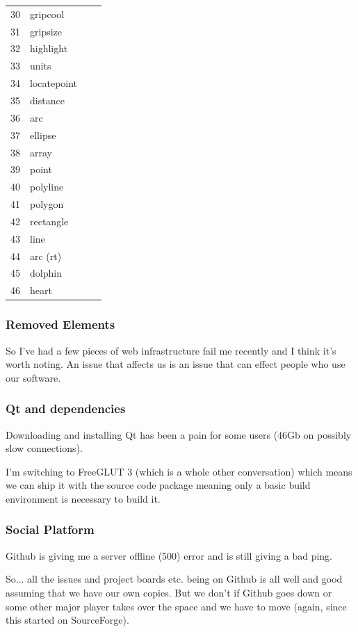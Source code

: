 \documentclass[a4paper, 11pt]{report}
\begin{document}
\begin{tabular}{l l l l}
30 & gripcool &  & \\
31 & gripsize &  & \\
32 & highlight &  & \\
33 & units &  & \\
34 & locatepoint &  & \\
35 & distance &  & \\
36 & arc &  & \\
37 & ellipse &  & \\
38 & array &  & \\
39 & point &  & \\
40 & polyline &  & \\
41 & polygon &  & \\
42 & rectangle &  & \\
43 & line &  & \\
44 & arc (rt) &  & \\
45 & dolphin &  & \\
46 & heart &  &
\end{tabular}

\subsubsection{Removed Elements}

So I've had a few pieces of web infrastructure fail me recently and
I think it's worth noting. An issue that affects us is an issue that
can effect people who use our software.

\subsubsection{Qt and dependencies}

Downloading and installing Qt has been a pain for some users
(46Gb on possibly slow connections).

I'm switching to FreeGLUT 3 (which is a whole other conversation) which means we
can ship it with the source code package meaning only a basic build
environment is necessary to build it.

\subsubsection{Social Platform}

Github is giving me a server offline (500) error and is still giving a bad ping.

So... all the issues and project boards etc. being on Github is all well and good assuming that we have our own copies. But we don't if Github goes down or some other major player takes over the space and we have to move (again, since this started on SourceForge).
\end{document}
